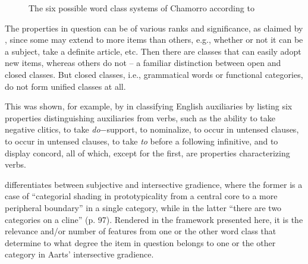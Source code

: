 \documentclass[output=paper]{langsci/langscibook}
\begin{document}
\begin{figure}
\caption{The six possible word class systems of Chamorro according to
\textcite{Haspelmath2012}}\label{tab:27.2}
\end{figure}

The properties in question can be of various ranks and significance, as claimed
by \citet{Crystal1967}, since some may extend to more items than others, e.g.,
whether or not it can be a subject, take a definite article, etc. Then there
are classes that can easily adopt new items, whereas others do not – a familiar
distinction between open and closed classes. But closed classes, i.e.,
grammatical words or functional categories, do not form unified classes at all.

This was shown, for example, by \citet{Radford1976} in classifying English
auxiliaries by listing six properties distinguishing auxiliaries from verbs,
such as the ability to take negative clitics, to take \emph{do}$-$support, to
nominalize, to occur in untensed clauses, to occur in untensed clauses, to take
\emph{to} before a following infinitive, and to display concord, all of which,
except for the first, are properties characterizing verbs.

\citet{Aarts2007} differentiates between subjective and intersective gradience,\linebreak
where the former is a case of “categorial shading in prototypicality from a
central core to a more peripheral boundary” in a single category, while in the
latter “there are two categories on a cline” (p. 97). Rendered in the framework
presented here, it is the relevance and/or number of features from one or the
other word class that determine to what degree the item in question belongs
to one or the other category in Aarts’ intersective gradience.
\end{document}
